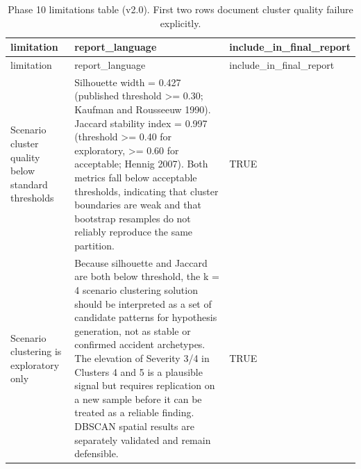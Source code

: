 \documentclass[
]{article}
\begin{document}
\begin{longtable}[]{@{}
  >{\raggedright\arraybackslash}p{}
  >{\raggedright\arraybackslash}p{}
  >{\raggedright\arraybackslash}p{}@{}}
\caption{Phase 10 limitations table (v2.0). First two rows document
cluster quality failure explicitly.}\tabularnewline
\toprule\noalign{}
\begin{minipage}[b]{\linewidth}\raggedright
limitation
\end{minipage} & \begin{minipage}[b]{\linewidth}\raggedright
report\_language
\end{minipage} & \begin{minipage}[b]{\linewidth}\raggedright
include\_in\_final\_report
\end{minipage} \\
\midrule\noalign{}
\endfirsthead
\toprule\noalign{}
\begin{minipage}[b]{\linewidth}\raggedright
limitation
\end{minipage} & \begin{minipage}[b]{\linewidth}\raggedright
report\_language
\end{minipage} & \begin{minipage}[b]{\linewidth}\raggedright
include\_in\_final\_report
\end{minipage} \\
\midrule\noalign{}
\endhead
\bottomrule\noalign{}
\endlastfoot
Scenario cluster quality below standard thresholds & Silhouette width =
0.427 (published threshold \textgreater= 0.30; Kaufman and Rousseeuw
1990). Jaccard stability index = 0.997 (threshold \textgreater= 0.40 for
exploratory, \textgreater= 0.60 for acceptable; Hennig 2007). Both
metrics fall below acceptable thresholds, indicating that cluster
boundaries are weak and that bootstrap resamples do not reliably
reproduce the same partition. & TRUE \\
Scenario clustering is exploratory only & Because silhouette and Jaccard
are both below threshold, the k = 4 scenario clustering solution should
be interpreted as a set of candidate patterns for hypothesis generation,
not as stable or confirmed accident archetypes. The elevation of
Severity 3/4 in Clusters 4 and 5 is a plausible signal but requires
replication on a new sample before it can be treated as a reliable
finding. DBSCAN spatial results are separately validated and remain
defensible. & TRUE \\

\end{longtable}
\end{document}
